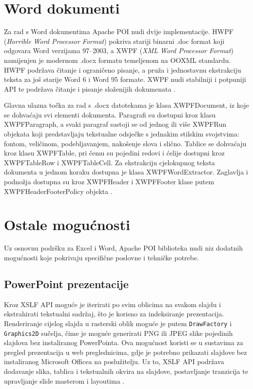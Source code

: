 \documentclass[]{foi}
\begin{document}
\section{Word dokumenti}

Za rad s Word dokumentima Apache POI nudi dvije implementacije. HWPF (\textit{Horrible Word Processor Format}) pokriva stariji binarni .doc format koji odgovara Word verzijama 97–2003, a XWPF (\textit{XML Word Processor Format}) namijenjen je modernom .docx formatu temeljenom na OOXML standardu. HWPF podržava čitanje i ograničeno pisanje, a pruža i jednostavnu ekstrakciju teksta za još starije Word 6 i Word 95 formate. XWPF nudi stabilniji i potpuniji API te podržava čitanje i pisanje složenijih dokumenata \cite{apacheApachePOIHWPFXWPF}.

Glavna ulazna točka za rad s .docx datotekama je klasa XWPFDocument, iz koje se dohvaćaju svi elementi dokumenta. Paragrafi su dostupni kroz klasu XWPFParagraph, a svaki paragraf sastoji se od jednog ili više XWPFRun objekata koji predstavljaju tekstualne odsječke s jednakim stilskim svojstvima: fontom, veličinom, podebljavanjem, nakošenje slova i slično. Tablice se dohvaćaju kroz klasu XWPFTable, pri čemu su pojedini redovi i ćelije dostupni kroz XWPFTableRow i XWPFTableCell. Za ekstrakciju cjelokupnog teksta dokumenta u jednom koraku dostupna je klasa XWPFWordExtractor. Zaglavlja i podnožja dostupna su kroz XWPFHeader i XWPFFooter klase putem XWPFHeaderFooterPolicy objekta \cite{apacheApachePOIHWPFXWPF}.

\section{Ostale mogućnosti}

Uz osnovnu podršku za Excel i Word, Apache POI biblioteka nudi niz dodatnih mogućnosti koje pokrivaju specifične poslovne i tehničke potrebe.

\subsection{PowerPoint prezentacije}

Kroz XSLF API moguće je iterirati po svim oblicima na svakom slajdu i ekstrahirati tekstualni sadržaj, što je korisno za indeksiranje prezentacija. Renderiranje cijelog slajda u rasterski oblik moguće je putem \texttt{DrawFactory} i \texttt{Graphics2D} sučelja, čime je moguće generirati PNG ili JPEG slike pojedinih slajdova bez instaliranog PowerPointa. Ova mogućnost koristi se u sustavima za pregled prezentacija u web preglednicima, gdje je potrebno prikazati slajdove bez instaliranog Microsoft Officea na poslužitelju. Uz to, XSLF API podržava dodavanje slika, tablica i tekstualnih okvira na slajdove, postavljanje tranzicija te upravljanje slide masterom i layoutima \cite{apachePOIXSLFCookbook}.
\end{document}
